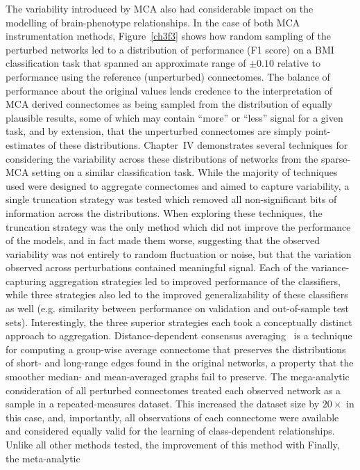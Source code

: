 The variability introduced by MCA also had considerable impact on the modelling of brain-phenotype relationships.
In the case of both MCA instrumentation methods, Figure~\ref{ch3f3} shows how random sampling of the perturbed
networks led to a distribution of performance (F1 score) on a BMI classification task that spanned an approximate
range of $\pm 0.10$ relative to performance using the reference (unperturbed) connectomes. The balance of
performance about the original values lends credence to the interpretation of MCA derived connectomes as being
sampled from the distribution of equally plausible results, some of which may contain ``more'' or ``less'' signal
for a given task, and by extension, that the unperturbed connectomes are simply point-estimates of these
distributions. Chapter~IV demonstrates several techniques for considering the variability across these
distributions of networks from the sparse-MCA setting on a similar classification task. While the majority of
techniques used were designed to aggregate connectomes and aimed to capture variability, a single truncation
strategy was tested which removed all non-significant bits of information across the distributions. When exploring
these techniques, the truncation strategy was the only method which did not improve the performance of the models,
and in fact made them worse, suggesting that the observed variability was not entirely to random fluctuation or
noise, but that the variation observed across perturbations contained meaningful signal. Each of the
variance-capturing aggregation strategies led to improved performance of the classifiers, while three strategies
also led to the improved generalizability of these classifiers as well (e.g. similarity between performance on
validation and out-of-sample test sets). Interestingly, the three superior strategies each took a conceptually
distinct approach to aggregation. Distance-dependent consensus averaging~\cite{Betzel2018-eo} is a technique for
computing a group-wise average connectome that preserves the distributions of short- and long-range edges found in
the original networks, a property that the smoother median- and mean-averaged graphs fail to preserve. The
mega-analytic consideration of all perturbed connectomes treated each observed network as a sample in a
repeated-measures dataset. This increased the dataset size by $20 \times$ in this case, and, importantly, all
observations of each connectome were available and considered equally valid for the learning of class-dependent
relationships. Unlike all other methods tested, the improvement of this method with  Finally, the meta-analytic
